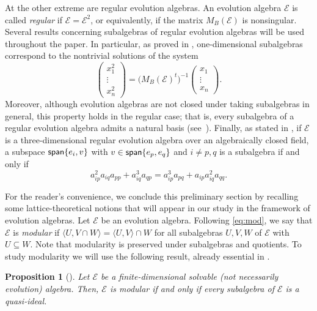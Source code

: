 \documentclass[12pt,reqno]{amsart}
\theoremstyle{plain}%
\newtheorem{proposition}[theorem]{Proposition}%
\theoremstyle{definition}
\theoremstyle{remark}
\newcommand{\E}{\mathcal{E}}
\DeclareMathOperator{\spa}{\textup{\textsf{span}}}
\numberwithin{equation}{section}
\begin{document}
 At the other extreme are regular evolution algebras. An evolution algebra $\E$ is called \textit{regular} if $\E=\E^2$, or equivalently, if the matrix $M_B(\E)$ is nonsingular.
Several results concerning subalgebras of regular evolution algebras will be used throughout the paper. In particular, as proved in \cite[Lemma~1]{LP_25_regular}, one-dimensional subalgebras correspond to the nontrivial solutions of the system
\begin{equation*}\label{sist}
	\begin{pmatrix}
		x_1^2 \\ \vdots \\ x_n^2
	\end{pmatrix}
	=
	\big(M_B(\E)^t\big)^{-1}
	\begin{pmatrix}
		x_1 \\ \vdots \\ x_n
	\end{pmatrix}.
\end{equation*}
 Moreover, although evolution algebras are not closed under taking subalgebras in general, this property holds in the regular case; that is, every subalgebra of a regular evolution algebra admits a natural basis (see~\cite[Theorem~2]{LP_25_regular}). Finally, as stated in \cite[Corollary~7]{LP_25_regular}, if $\E$ is a three-dimensional regular evolution algebra over an algebraically closed field, a subspace $\spa\{e_i,v\}$ with $v\in\spa\{e_p,e_q\}$ and $i\neq p,q$ is a subalgebra if and only if
\[
a_{ip}^2a_{iq}a_{pp}+a_{iq}^3a_{qp}
=
a_{ip}^3a_{pq}+a_{ip}a_{iq}^2a_{qq}.
\]

For the reader's convenience, we conclude this preliminary section by recalling some lattice-theoretical notions that will appear in our study in the framework of evolution algebras. Let $\mathcal{E}$ be an evolution algebra. Following \eqref{eq:mod}, we say that $\mathcal{E}$ is \textit{modular} if $
\langle U,V\cap W\rangle=\langle U,V\rangle\cap W$
for all subalgebras $U,V,W$ of $\mathcal{E}$ with $U\subseteq W$. Note that modularity is preserved under subalgebras  and quotients. To study modularity we will use the following result, already essential in \cite{LPP_25}.

\begin{proposition}[{\cite[Theorem 2.2]{An_94}}]\label{prop:equiv_mod_qi}
Let $\mathcal{E}$ be a finite-dimensional solvable (not necessarily evolution) algebra. Then, $\E$ is modular if and only if every subalgebra of $\mathcal{E}$ is a quasi-ideal.
\end{proposition}
\end{document}
